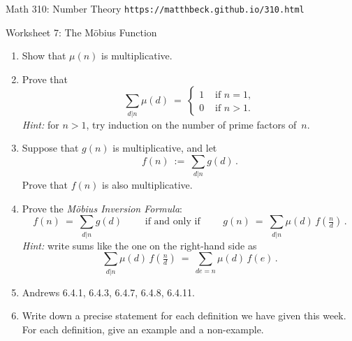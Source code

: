 \documentclass[11pt]{article}
\begin{document}
\setlength{\parindent}{0pt}
\setlength{\parskip}{0.2cm}

{ Math 310: Number Theory} \hfill {\tt https://matthbeck.github.io/310.html}

\vspace{.3in}

\begin{center}
\Large{Worksheet 7: The M\"obius Function}
\end{center}

\begin{enumerate}

\item Show that $\mu(n)$ is multiplicative.

\item Prove that
\[
  \sum_{ d|n } \mu(d) \ = \ \begin{cases}
    1 & \text{ if } n=1, \\
    0 & \text{ if } n>1.
  \end{cases}
\]
\emph{Hint:} for $n>1$, try induction on the number of prime factors of~$n$.

\item Suppose that $g(n)$ is multiplicative, and let
\[
  f(n) \ := \ \sum_{ d|n } g(d) \, .
\]
Prove that $f(n)$ is also multiplicative.

\item Prove the \emph{M\"obius Inversion Formula}:
\[
  f(n) \ = \ \sum_{ d|n } g(d)
  \qquad \text{ if and only if } \qquad
  g(n) \ = \ \sum_{ d|n } \mu(d) \, f(\tfrac n d) \, .
\]
\emph{Hint:} write sums like the one on the right-hand side as
\[
  \sum_{ d|n } \mu(d) \, f(\tfrac n d) \ = \ \sum_{ de = n } \mu(d) \, f(e) \, .
\]

\item Andrews 6.4.1, 6.4.3, 6.4.7, 6.4.8, 6.4.11.
 
\item Write down a precise statement for each definition we have given this week.
For each definition, give an example and a non-example.

\end{enumerate}
\end{document}
